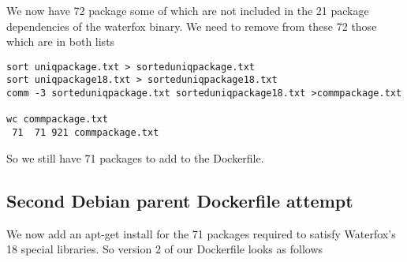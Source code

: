 \documentclass[a4paper]{article}  %
\begin{document}
We now have 72 package some of which  are not included in  the 21  package dependencies of the waterfox binary. We need to remove from these 72 those which are  in both lists
\begin{tcolorbox}
\begin{verbatim}
sort uniqpackage.txt > sorteduniqpackage.txt
sort uniqpackage18.txt > sorteduniqpackage18.txt
comm -3 sorteduniqpackage.txt sorteduniqpackage18.txt >commpackage.txt

wc commpackage.txt
 71  71 921 commpackage.txt
\end{verbatim}
\end{tcolorbox}
So we still have 71 packages to add to the Dockerfile.

\subsection{Second Debian parent Dockerfile attempt}
We now add an apt-get install for the 71 packages required to satisfy Waterfox's 18 special libraries. So version 2 of our Dockerfile looks as follows
\end{document}
